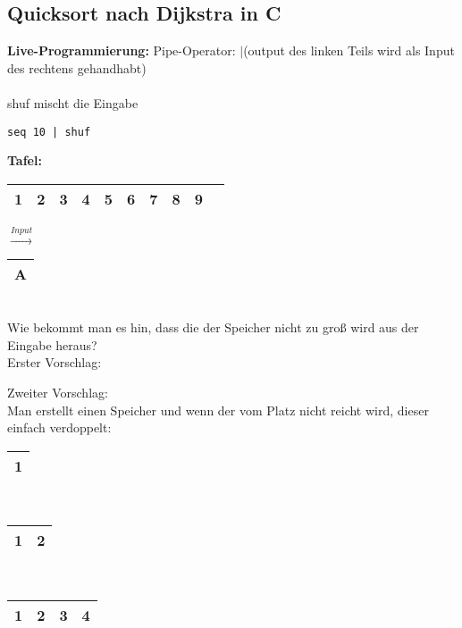 \subsection{Quicksort nach Dijkstra in C}

\textbf{Live-Programmierung:}
Pipe-Operator: $|$(output des linken Teils wird als Input des rechtens gehandhabt)\\
\\
shuf mischt die Eingabe
\begin{center}
\begin{lstlisting}
seq 10 | shuf
\end{lstlisting}
\end{center}

\textbf{Tafel:}\\

\begin{tabular}{|c|c|c|c|c|c|c|c|c|c|}
    \hline
    1 & 2&3&4&5&6&7&8&9\\\hline
\end{tabular} $\overset{Input}{\rightarrow}$ \begin{tabular}{|c|}
    \hline
    A\\\hline
\end{tabular}\\

Wie bekommt man es hin, dass die der Speicher nicht zu groß wird aus der Eingabe heraus?\\
Erster Vorschlag:
Zweiter Vorschlag:\\
Man erstellt einen Speicher und wenn der vom Platz nicht reicht wird, dieser einfach verdoppelt:
\begin{center}
    \begin{tabular}{|c|}
        \hline 1 \\\hline
    \end{tabular}
    \\
    \begin{tabular}{|c|c|}
        \hline 1 & 2 \\\hline
    \end{tabular}
    \\
    \begin{tabular}{|c|c|c|c|}
        \hline 1 & 2 & 3 & 4\\\hline
    \end{tabular}
\end{center}

